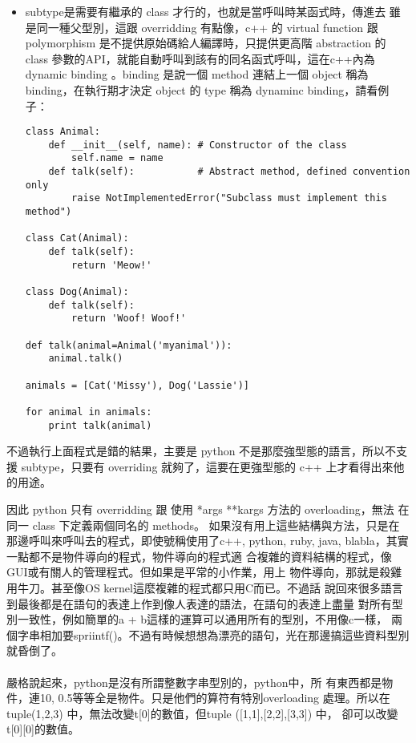 \begin{description}
\begin{itemize}
      \item subtype是需要有繼承的 class 才行的，也就是當呼叫時某函式時，傳進去
        雖是同一種父型別，這跟 overridding 有點像，c++ 的 virtual function 跟
        polymorphism 是不提供原始碼給人編譯時，只提供更高階 abstraction 的 class
        參數的API，就能自動呼叫到該有的同名函式呼叫，這在c++內為 dynamic binding
        。binding 是說一個 method 連結上一個 object 稱為 binding，在執行期才決定
        object 的 type 稱為 dynaminc binding，請看例子：
        \begin{verbatim}
class Animal:
    def __init__(self, name): # Constructor of the class
        self.name = name
    def talk(self):           # Abstract method, defined convention only
        raise NotImplementedError("Subclass must implement this method")
 
class Cat(Animal):
    def talk(self):
        return 'Meow!'
 
class Dog(Animal):
    def talk(self):
        return 'Woof! Woof!'
 
def talk(animal=Animal('myanimal')):
    animal.talk()

animals = [Cat('Missy'), Dog('Lassie')]
 
for animal in animals:
    print talk(animal)
        \end{verbatim}
    \end{itemize}
    不過執行上面程式是錯的結果，主要是 python 不是那麼強型態的語言，所以不支
    援 subtype，只要有 overriding 就夠了，這要在更強型態的 c++ 上才看得出來他
    的用途。
\end{description}
  因此 python 只有 overridding 跟 使用 *args **kargs 方法的 overloading，無法
  在同一 class 下定義兩個同名的 methods。
  如果沒有用上這些結構與方法，只是在那邊呼叫來呼叫去的程式，即使號稱使用了c++,
  python, ruby, java, blabla，其實一點都不是物件導向的程式，物件導向的程式適
  合複雜的資料結構的程式，像GUI或有關人的管理程式。但如果是平常的小作業，用上
  物件導向，那就是殺雞用牛刀。甚至像OS kernel這麼複雜的程式都只用C而已。不過話
  說回來很多語言到最後都是在語句的表達上作到像人表達的語法，在語句的表達上盡量
  對所有型別一致性，例如簡單的a + b這樣的運算可以通用所有的型別，不用像c一樣，
  兩個字串相加要spriintf()。不過有時候想想為漂亮的語句，光在那邊搞這些資料型別
  就昏倒了。
  \\\\
  嚴格說起來，python是沒有所謂整數字串型別的，python中，所
  有東西都是物件，連10, 0.5等等全是物件。只是他們的算符有特別overloading
  處理。所以在tuple(1,2,3) 中，無法改變t[0]的數值，但tuple ([1,1],[2,2],[3,3])
  中， 卻可以改變t[0][0]的數值。

